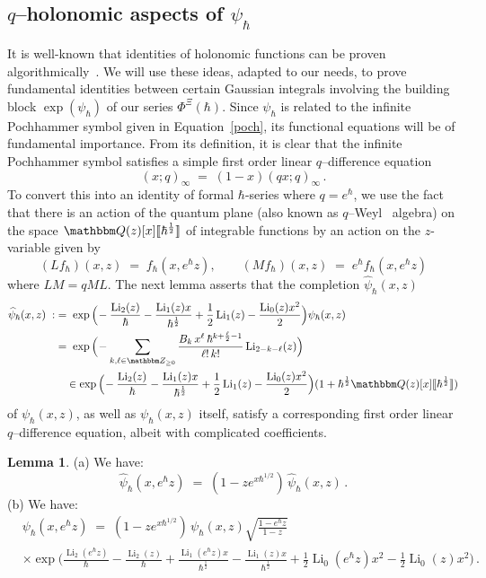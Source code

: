 \documentclass[12pt,reqno]{amsart}
\theoremstyle{definition}
\newtheorem{lemma}[theorem]{Lemma}
\def\BZ{\mathbbm Z}
\def\BQ{\mathbbm Q}
\def\be{\begin{equation}}
\def\ee{\end{equation}}
\renewcommand{\=}{\;=\;}
\newcommand{\Li}{\operatorname{Li}}
\newcommand{\hroot}{\hbar^{\frac{1}{2}}}
\begin{document}
\subsection{\texorpdfstring{$q$--holonomic aspects of $\psi_\hbar$}{q-holonomic aspects of psi}}
\label{sub.qhol}
It is well-known that identities of holonomic functions can be proven 
algorithmically~\cite{WZ,PWZ}. We will use these ideas, adapted to our needs,
to prove fundamental identities between certain Gaussian integrals involving
the building block $\exp(\psi_{\hbar})$ of our series $\Phi^\Xi(\hbar)$.
Since $\psi_{\hbar}$ is related to the infinite Pochhammer symbol given in
Equation~\eqref{poch}, its functional equations will be of fundamental importance.
From its definition, it is clear that the infinite Pochhammer symbol
satisfies a simple first order linear $q$--difference equation
\be
\label{eq.poch}
(x;q)_{\infty} \= (1-x)(qx;q)_{\infty} \,.
\ee
To convert this into an identity of formal $\hbar$-series where $q=e^{\hbar}$,
we use the fact that there is an action of the quantum plane
(also known as
$q$--Weyl~\cite[Ex. 1.7]{Etingof} algebra)
on the space $\BQ(z)[x]\llbracket\hroot\rrbracket$
of integrable functions by an action on the $z$-variable given by
\be
\label{ML}
(L f_\hbar)(x,z) \= f_\hbar(x,e^{\hbar} z), \qquad
(M f_\hbar)(x,z) \= e^{\hbar} f_\hbar(x,e^{\hbar} z)
\ee
where $LM=qML$. The next lemma asserts that the completion
$\widehat{\psi}_{\hbar}(x,z)$ 
\be
\label{eq.psicomp}
\begin{aligned}
\widehat{\psi}_{\hbar}(x,z)
\;:&=\;
\exp\Big(\!
-\frac{\Li_{2}(z)}{\hbar}
-\frac{\Li_{1}(z)x}{\hbar^{\frac{1}{2}}}
+\frac{1}{2}\Li_{1}(z)
-\frac{\Li_{0}(z)x^2}{2}
\Big)
\psi_{\hbar}(x,z) \\
&=\;
\exp\Big(\!
-\sum_{k,\ell\in\BZ_{\geq0}}
\frac{B_{k}\,x^{\ell}\,\hbar^{k+\frac{\ell}{2}-1}}{\ell!\,k!}\Li_{2-k-\ell}(z)\Big)
\\
&\quad\in
\exp\Big(\!-\frac{\Li_{2}(z)}{\hbar}
-\frac{\Li_{1}(z)x}{\hbar^{\frac{1}{2}}}
+\frac{1}{2}\Li_{1}(z)
-\frac{\Li_{0}(z)x^2}{2}
\Big)(1+\hbar^{\frac{1}{2}}\BQ(z)[x]\llbracket\hbar^{\frac{1}{2}}
\rrbracket)
\end{aligned}
\ee
of $\psi_{\hbar}(x,z)$, as well as $\psi_{\hbar}(x,z)$ itself, satisfy a
corresponding first order linear $q$--difference equation, albeit with
complicated coefficients.

\begin{lemma}
\label{lem.psihdiff}
\rm{(a)} We have:
\be
\label{eq.qdiff.of.psih}
\widehat{\psi}_{\hbar}(x,e^{\hbar}z)
\=
(1-ze^{x\hbar^{1/2}})\,\widehat{\psi}_{\hbar}(x,z)\,.
\ee
\rm{(b)} We have:
\be
\label{eq.qdiff.of.psi}
\begin{aligned}
&\psi_{\hbar}(x,e^{\hbar}z)
\=
(1-ze^{x\hbar^{1/2}})
\,\psi_{\hbar}(x,z)
\sqrt{\frac{1-e^{\hbar}z}{1-z}}\\
&\times
\exp\Big(\frac{\Li_{2}(e^{\hbar}z)}{\hbar}-\frac{\Li_{2}(z)}{\hbar}
+\frac{\Li_{1}(e^{\hbar}z)x}{\hbar^{\frac{1}{2}}}
-\frac{\Li_{1}(z)x}{\hbar^{\frac{1}{2}}}
+\frac{1}{2}\Li_{0}(e^{\hbar}z)x^2
-\frac{1}{2}\Li_{0}(z)x^2\Big)\,.
\end{aligned}
\ee
\end{lemma}
\end{document}

